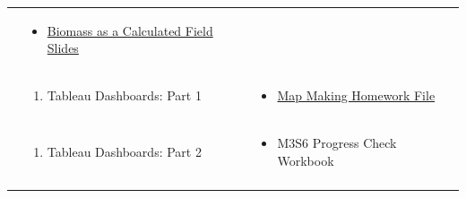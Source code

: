 \documentclass[
]{book}
\providecommand{\tightlist}{%
  \setlength{\itemsep}{0pt}\setlength{\parskip}{0pt}}
\begin{document}
\begin{longtable}[]{@{}lll@{}}
\begin{minipage}[t]{0.34\columnwidth}
\end{minipage} & \begin{minipage}[t]{0.42\columnwidth}\raggedright
\begin{itemize}
\tightlist
\item
  \href{files/M3S4_calculated_field_biomass_example.pdf}{Biomass as a Calculated Field Slides}
\end{itemize}\strut
\end{minipage}\tabularnewline
\begin{minipage}[t]{0.15\columnwidth}\raggedright
\strut
\end{minipage} & \begin{minipage}[t]{0.34\columnwidth}\raggedright
\begin{enumerate}
\def\labelenumi{\arabic{enumi}.}
\setcounter{enumi}{4}
\tightlist
\item
  Tableau Dashboards: Part 1
\end{enumerate}\strut
\end{minipage} & \begin{minipage}[t]{0.42\columnwidth}\raggedright
\begin{itemize}
\tightlist
\item
  \href{files/M3S5_exercise_key.twbx}{Map Making Homework File}
\end{itemize}\strut
\end{minipage}\tabularnewline
\begin{minipage}[t]{0.15\columnwidth}\raggedright
\strut
\end{minipage} & \begin{minipage}[t]{0.34\columnwidth}\raggedright
\begin{enumerate}
\def\labelenumi{\arabic{enumi}.}
\setcounter{enumi}{5}
\tightlist
\item
  Tableau Dashboards: Part 2
\end{enumerate}\strut
\end{minipage} & \begin{minipage}[t]{0.42\columnwidth}\raggedright
\begin{itemize}
\tightlist
\item
  M3S6 Progress Check Workbook
\end{itemize}\strut
\end{minipage}\tabularnewline
\begin{minipage}[t]{0.15\columnwidth}\raggedright
\strut
\end{minipage} & \begin{minipage}[t]{0.34\columnwidth}\raggedright

\end{minipage}
\end{longtable}
\end{document}
